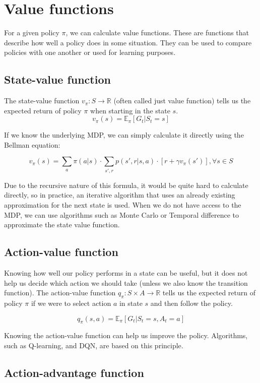 \documentclass[
  digital,     %
  oneside,     %
  nosansbold,  %
  nocolorbold, %
  lof,         %
  lot,         %
]{fithesis4}
\begin{document}
\section{Value functions}

For a given policy $\pi$, we can calculate value functions. These are functions that describe how well a policy does in some situation. They can be used to compare policies with one another or used for learning purposes.

\subsection{State-value function}
The state-value function $v_\pi\colon S\to \mathbb{R}$ (often called just value function) tells us the expected return of policy $\pi$ when starting in the state $s$.
\[
v_\pi(s) = \mathbb{E}_\pi [G_t|S_t=s]
\]

If we know the underlying MDP, we can simply calculate it directly using the Bellman equation:

\[
v_\pi(s) = \sum_a \pi(a|s) \cdot \sum_{s',r} p(s',r|s,a)\cdot[r+\gamma v_\pi(s')], \forall s \in S
\]

Due to the recursive nature of this formula, it would be quite hard to calculate directly, so in practice, an iterative algorithm that uses an already existing approximation for the next state is used. When we do not have access to the MDP, we can use algorithms such as Monte Carlo or Temporal difference to approximate the state value function.

\subsection{Action-value function}

Knowing how well our policy performs in a state can be useful, but it does not help us decide which action we should take (unless we also know the transition function). The action-value function $q_\pi\colon S \times A \to \mathbb{R}$ tells us the expected return of policy $\pi$ if we were to select action $a$ in state $s$ and then follow the policy.

\[
q_\pi(s,a) = \mathbb{E}_\pi [G_t|S_t=s,A_t=a]
\]

Knowing the action-value function can help us improve the policy. Algorithms, such as Q-learning, and DQN, are based on this principle.

\subsection{Action-advantage function}
\end{document}
